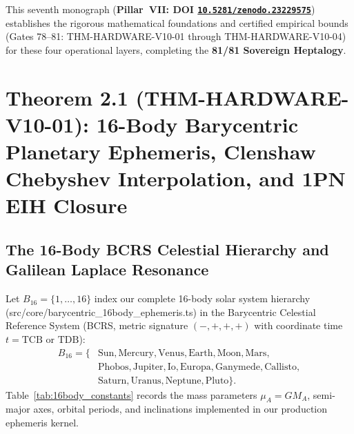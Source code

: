 \documentclass[11pt,a4paper,reqno]{article}
\def\texttt#1{#1}%
\def\mathcal#1{#1}%
\newcommand{\zenodo}[1]{\href{https://doi.org/10.5281/zenodo.#1}{\nolinkurl{10.5281/zenodo.#1}}}
\theoremstyle{plain}
\theoremstyle{definition}
\theoremstyle{remark}
\numberwithin{equation}{section}
\begin{document}
This seventh monograph (\textbf{Pillar~VII: DOI \zenodo{23229575}}) establishes the rigorous mathematical foundations and certified empirical bounds (\texttt{Gates 78--81}: \texttt{THM-HARDWARE-V10-01} through \texttt{THM-HARDWARE-V10-04}) for these four operational layers, completing the \textbf{81/81 Sovereign Heptalogy}.

\section{\texorpdfstring{Theorem 2.1 (\texttt{THM-HARDWARE-V10-01}): 16-Body Barycentric Planetary Ephemeris, Clenshaw Chebyshev Interpolation, and 1PN EIH Closure}{Theorem 2.1 (THM-HARDWARE-V10-01): 16-Body Barycentric Planetary Ephemeris, Clenshaw Chebyshev Interpolation, and 1PN EIH Closure}}

\subsection{The 16-Body BCRS Celestial Hierarchy and Galilean Laplace Resonance}
Let $\mathcal{B}_{16} = \{1, \dots, 16\}$ index our complete 16-body solar system hierarchy (\texttt{src/core/barycentric\_16body\_ephemeris.ts}) in the Barycentric Celestial Reference System (BCRS, metric signature $(-,+,+,+)$ with coordinate time $t = \text{TCB}$ or $\text{TDB}$):
\begin{equation}
  \begin{aligned}
    \mathcal{B}_{16} = \big\{&\text{Sun}, \text{Mercury}, \text{Venus}, \text{Earth}, \text{Moon}, \text{Mars},\\
    &\text{Phobos}, \text{Jupiter}, \text{Io}, \text{Europa}, \text{Ganymede}, \text{Callisto},\\
    &\text{Saturn}, \text{Uranus}, \text{Neptune}, \text{Pluto}\big\}.
  \end{aligned}
  \label{eq:16body_set}
\end{equation}
Table~\ref{tab:16body_constants} records the mass parameters $\mu_A = GM_A$, semi-major axes, orbital periods, and inclinations implemented in our production ephemeris kernel.
\end{document}
